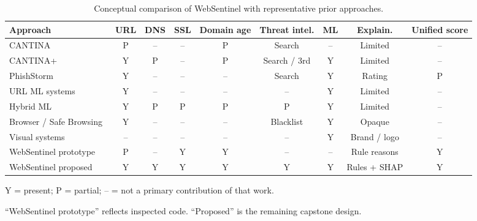 
\begin{table}[!t]
\centering
\caption{Conceptual comparison of WebSentinel with representative prior approaches.}
\label{tab:comparison}
\begin{tabular}{lcccccccc}
\toprule
Approach & URL & DNS & SSL & Domain age & Threat intel. & ML & Explain. & Unified score \\
\midrule
CANTINA~\cite{zhang2007cantina} & P & -- & -- & P & Search & -- & Limited & -- \\
CANTINA+~\cite{xiang2011cantinaplus} & Y & P & -- & P & Search / 3rd & Y & Limited & -- \\
PhishStorm~\cite{marchal2014phishstorm} & Y & -- & -- & -- & Search & Y & Rating & P \\
URL ML systems~\cite{sahingoz2019ml,rao2019catchphish} & Y & -- & -- & -- & -- & Y & Limited & -- \\
Hybrid ML~\cite{rao2019detection} & Y & P & P & P & P & Y & Limited & -- \\
Browser / Safe Browsing~\cite{whittaker2010large} & Y & -- & -- & -- & Blacklist & Y & Opaque & -- \\
Visual systems~\cite{lin2021phishpedia,abdelnabi2020visualphishnet} & -- & -- & -- & -- & -- & Y & Brand / logo & -- \\
WebSentinel prototype & P & -- & Y & Y & -- & -- & Rule reasons & Y \\
WebSentinel proposed & Y & Y & Y & Y & Y & Y & Rules + SHAP & Y \\
\bottomrule
\end{tabular}
\begin{tablenotes}
\footnotesize
\item Y = present; P = partial; -- = not a primary contribution of that work.
\item ``WebSentinel prototype'' reflects inspected code. ``Proposed'' is the remaining capstone design.
\end{tablenotes}
\end{table}

